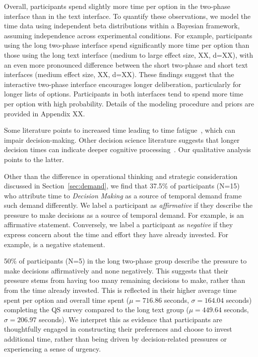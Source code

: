 Overall, participants spend slightly more time per option in the two-phase interface than in the text interface. To quantify these observations, we model the time data using independent beta distributions within a Bayesian framework, assuming independence across experimental conditions. For example, participants using the long two-phase interface spend significantly more time per option than those using the long text interface (medium to large effect size, XX, d=XX), with an even more pronounced difference between the short two-phase and short text interfaces (medium effect size, XX, d=XX). These findings suggest that the interactive two-phase interface encourages longer deliberation, particularly for longer lists of options. Participants in both interfaces tend to spend more time per option with high probability. Details of the modeling procedure and priors are provided in Appendix XX.

Some literature points to increased time leading to time fatigue~\cite{}, which can impair decision-making. Other decision science literature suggests that longer decision times can indicate deeper cognitive processing~\cite{payneAdaptiveDecisionMaker1993}. Our qualitative analysis points to the latter. 

Other than the difference in operational thinking and strategic consideration discussed in Section~\ref{sec:demand}, we find that 37.5\% of participants (N=15) who attribute time to \textit{Decision Making} as a source of temporal demand frame such demand differently. We label a participant as \textit{affirmative} if they describe the pressure to make decisions as a source of temporal demand. For example,  is an affirmative statement. Conversely, we label a participant as \textit{negative} if they express concern about the time and effort they have already invested. For example,  is a negative statement.

50\% of participants (N=5) in the long two-phase group describe the pressure to make decisions affirmatively and none negatively. This suggests that their pressure stems from having too many remaining decisions to make, rather than from the time already invested. This is reflected in their higher average time spent per option and overall time spent ($\mu=716.86$ seconds, $\sigma=164.04$ seconds) completing the QS survey compared to the long text group ($\mu=449.64$ seconds, $\sigma=206.97$ seconds). We interpret this as evidence that participants are thoughtfully engaged in constructing their preferences and choose to invest additional time, rather than being driven by decision-related pressures or experiencing a sense of urgency.

